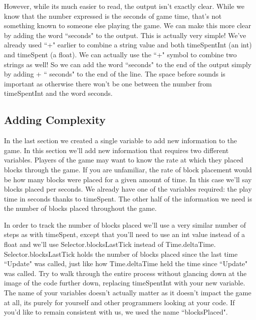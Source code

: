 \documentclass{article}
\begin{document}
\noindent{} 

However, while its much easier to read, the output isn't exactly clear. While we know that the number expressed is the seconds of game time, that's not something known to someone else playing the game. We can make this more clear by adding the word ``seconds" to the output. This is actually very simple! We've already used ``+" earlier to combine a string value and both timeSpentInt (an int) and timeSpent (a float). We can actually use the ``+" symbol to combine two strings as well! So we can add the word ``seconds" to the end of the output simply by adding + `` seconds" to the end of the line. The space before sounds is important as otherwise there won't be one between the number from timeSpentInt and the word seconds.

\subsection{Adding Complexity}

In the last section we created a single variable to add new information to the game. In this section we'll add new information that requires two different variables. Players of the game may want to know the rate at which they placed blocks through the game. If you are unfamiliar, the rate of block placement would be how many blocks were placed for a given amount of time. In this case we'll say blocks placed per seconds. We already have one of the variables required: the play time in seconds thanks to timeSpent. The other half of the information we need is the number of blocks placed throughout the game. 

In order to track the number of blocks placed we'll use a very similar number of steps as with timeSpent, except that you'll need to use an int value instead of a float and we'll use Selector.blocksLastTick instead of Time.deltaTime. Selector.blocksLastTick holds the number of blocks placed since the last time ``Update" was called, just like how Time.deltaTime held the time since ``Update" was called. Try to walk through the entire process without glancing down at the image of the code further down, replacing timeSpentInt with your new variable. The name of your variables doesn't actually matter as it doesn't impact the game at all, its purely for yourself and other programmers looking at your code. If you'd like to remain consistent with us, we used the name ``blocksPlaced". 
\end{document}
